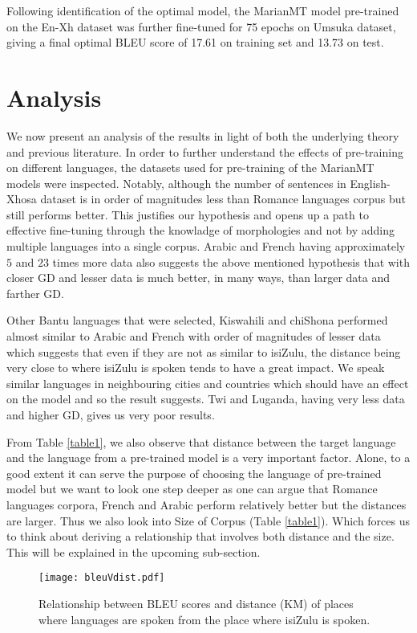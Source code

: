 \documentclass[11pt]{article}
\begin{document}
Following identification of the optimal model, the MarianMT model pre-trained on the En-Xh dataset was further fine-tuned for 75 epochs on Umsuka dataset, giving a final optimal BLEU score of 17.61 on training set and 13.73 on test.  



\section{Analysis}

We now present an analysis of the results in light of both the underlying theory and previous literature. In order to further understand the effects of pre-training on different languages, the datasets used for pre-training of the MarianMT models were inspected. Notably, although the number of sentences in English-Xhosa dataset is in order of magnitudes less than Romance languages corpus but still performs better. This justifies our hypothesis and opens up a path to effective fine-tuning through the knowladge of morphologies and not by adding multiple languages into a single corpus. Arabic and French having approximately $5$ and $23$ times more data also suggests the above mentioned hypothesis that with closer GD and lesser data is much better, in many ways, than larger data and farther GD.

Other Bantu languages that were selected, Kiswahili and chiShona performed almost similar to Arabic and French with order of magnitudes of lesser data which suggests that even if they are not as similar to isiZulu, the distance being very close to where isiZulu is spoken tends to have a great impact. We speak similar languages in neighbouring cities and countries which should have an effect on the model and so the result suggests. Twi and Luganda, having very less data and higher GD, gives us very poor results.

From Table \ref{table1}, we also observe that distance between the target language and the language from a pre-trained model is a very important factor. Alone, to a good extent it can serve the purpose of choosing the language of pre-trained model but we want to look one step deeper as one can argue that Romance languages corpora, French and Arabic perform relatively better but the distances are larger. Thus we also look into Size of Corpus (Table \ref{table1}). Which forces us to think about deriving a relationship that involves both distance and the size. This will be explained in the upcoming sub-section.

\begin{figure*}[h!]
\centering
\texttt{[image: bleuVdist.pdf]}
\caption{Relationship between BLEU scores and distance (KM) of places where languages are spoken from the place where isiZulu is spoken. }
\label{resultfig2}
\end{figure*}
\end{document}
